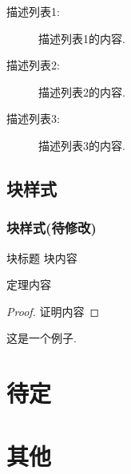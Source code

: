 \documentclass[
aspectratio=169,%
]{beamer}
\begin{document}
\begin{frame}
    \begin{description}
        \item[描述列表1: ] 描述列表1的内容.
        \item[描述列表2: ] 描述列表2的内容.
        \item[描述列表3: ] 描述列表3的内容.
    \end{description}
\end{frame}
\subsection{块样式}

\begin{frame}\frametitle{块样式\alert{(待修改)}}

    \begin{block}{块标题}
        块内容
    \end{block}

    \begin{theorem}[Kummer, 1992]
        定理内容
    \end{theorem}

    \begin{proof}
        证明内容
    \end{proof}

    \begin{example}
        这是一个例子.
    \end{example}

\end{frame}

\section{待定}
\begin{frame}
    \sectionpage
\end{frame}
\section{其他}
\end{document}
